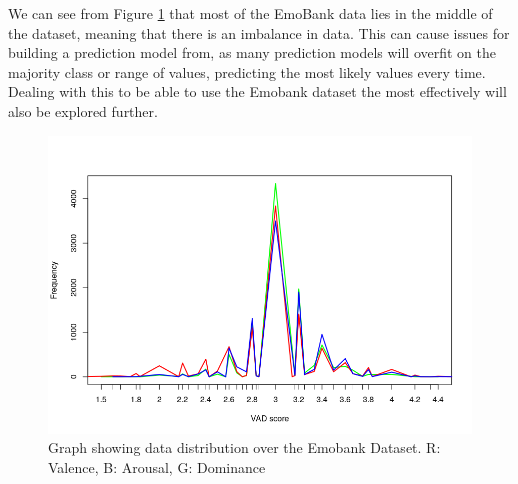 We can see from Figure \ref{dist:vad} that most of the EmoBank data lies in the middle of the dataset, meaning that there is an imbalance in data. This can cause issues for building a prediction model from, as many prediction models will overfit on the majority class or range of values, predicting the most likely values every time. Dealing with this to be able to use the Emobank dataset the most effectively will also be explored further.

\begin{figure}[h]
\centering
\includegraphics[scale=0.5]{graphs/VADdistribution.png}
\caption{Graph showing data distribution over the Emobank Dataset. R: Valence, B: Arousal, G: Dominance}
\label{dist:vad}
\end{figure}

